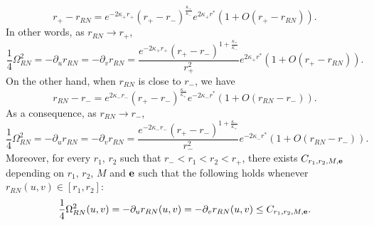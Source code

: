 \documentclass[10pt, reqno]{amsart}
\theoremstyle{definition}
\theoremstyle{remark}
\numberwithin{equation}{section}
\newcommand{\rd}{\partial}
\newcommand{\0}{\emptyset}
\newcommand{\Omg}{\Omega}
\newcommand{\f}{\frac}
\begin{document}
$$r_+-r_{RN}=e^{-2\kappa_+ r_+}(r_+-r_-)^{\f{\kappa_+}{\kappa_-}}e^{2\kappa_+ r^*}(1+O(r_+-r_{RN})).$$
In other words, as $r_{RN}\to r_+$,
\begin{equation} \label{eq:Omg-H}
\f 14\Omg_{RN}^2=-\rd_u r_{RN}=-\rd_v r_{RN}=\f{e^{-2\kappa_+ r_+}(r_+-r_-)^{1+\f{\kappa_+}{\kappa_-}}}{r_+^2}e^{2\kappa_+ r^*}(1+O(r_+-r_{RN})).
\end{equation}
On the other hand, when $r_{RN}$ is close to $r_-$, we have
$$r_{RN}-r_-=e^{2\kappa_-r_-}(r_+-r_-)^{\f{\kappa_-}{\kappa_+}}e^{-2\kappa_-r^*}(1+O(r_{RN}-r_-)).$$
As a consequence, as $r_{RN}\to r_-$,
\begin{equation} \label{eq:Omg-CH}
\f 14\Omg_{RN}^2=-\rd_u r_{RN}=-\rd_v r_{RN}=\f{e^{-2\kappa_-r_-}(r_+-r_-)^{1+\f{\kappa_-}{\kappa_+}}}{r_-^2}e^{-2\kappa_-r^*}(1+O(r_{RN}-r_-)).
\end{equation}
Moreover, for every $r_1$, $r_2$ such that $r_-<r_1<r_2<r_+$, there exists $C_{r_1,r_2,M,{\bf e}}$ depending on $r_1$, $r_2$, $M$ and ${\bf e}$ such that the following holds whenever $r_{RN}(u,v)\in [r_1,r_2]$:
$$\f 14\Omg_{RN}^2(u,v)=-\rd_u r_{RN}(u,v)=-\rd_v r_{RN}(u,v)\leq C_{r_1,r_2,M,{\bf e}}.$$
\end{document}
